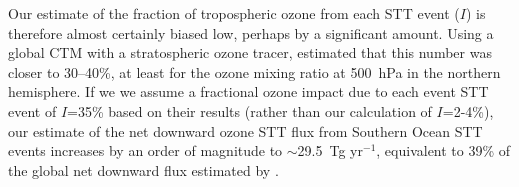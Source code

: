   

  Our estimate of the fraction of tropospheric ozone from each STT event ($I$) is therefore almost certainly biased low, perhaps by a significant amount. 
  Using a global CTM with a stratospheric ozone tracer, \citet{Terao2008} estimated that this number was closer to 30--40\%, at least for the ozone mixing ratio at 500~hPa in the northern hemisphere.
  If we we assume a fractional ozone impact due to each event STT event of $I$=35\% based on their results (rather than our calculation of $I$=2-4\%), our estimate of the net downward ozone STT flux from Southern Ocean STT events increases by an order of magnitude to $\sim$29.5~Tg yr$^{-1}$, equivalent to 39\% of the global net downward flux estimated by \citet{Sprenger2003}.
  
